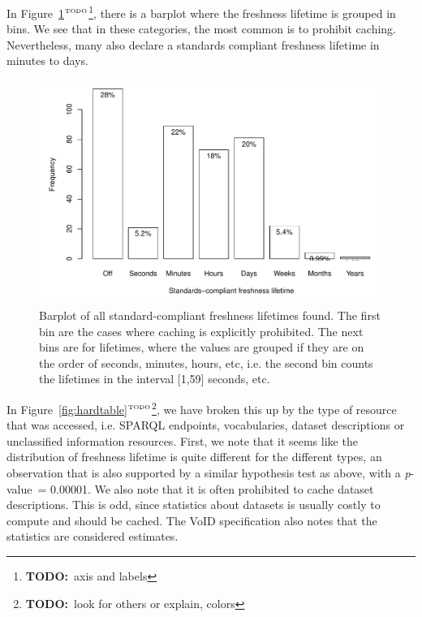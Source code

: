 \documentclass{llncs}
\newcommand{\pvalue}{\textit{p}-value\ }
\newcommand{\todo}[1]{\ensuremath{^{\textrm{\tiny{TODO}\normalsize}}}\footnote{\textbf{TODO:}~#1}}
\begin{document}
In Figure~\ref{fig:hardall}\todo{axis and labels}, there is a barplot where
the freshness lifetime is grouped in bins. We see that in these
categories, the most common is to prohibit caching. Nevertheless, many
also declare a standards compliant freshness lifetime in minutes to
days.

\begin{figure}[ht]
  \centerline{%
    \includegraphics[width=.9\textwidth]{hardall.pdf}}
  \caption{Barplot of all standard-compliant freshness lifetimes
    found. The first bin are the cases where caching is explicitly
    prohibited. The next bins are for lifetimes, where the values are
    grouped if they are on the order of seconds, minutes, hours, etc,
    i.e. the second bin counts the lifetimes in the interval [1,59]
    seconds, etc.}
  \label{fig:hardall}
\end{figure}



In Figure~\ref{fig:hardtable}\todo{look for others or explain, colors}, we have broken this
up by the type of resource that was accessed, i.e. SPARQL endpoints,
vocabularies, dataset descriptions or unclassified information
resources. First, we note that it seems like the distribution of
freshness lifetime is quite different for the different types, an
observation that is also supported by a similar hypothesis test as
above, with a \pvalue = 0.00001. We also note that it is often
prohibited to cache dataset descriptions. This is odd, since
statistics about datasets is usually costly to compute and should be
cached. The VoID specification \cite{voidnote} also notes that the
statistics are considered estimates.
\end{document}
